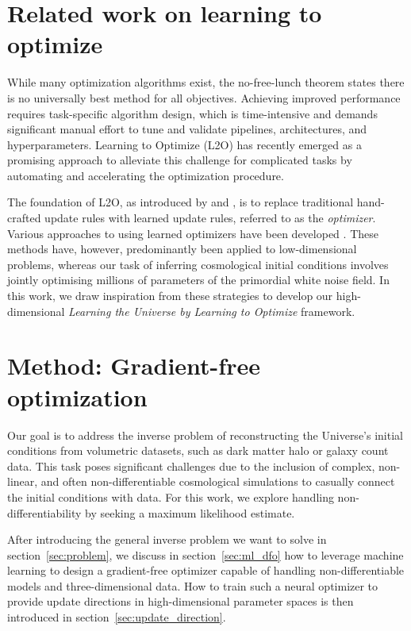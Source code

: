 \section{Related work on learning to optimize}
\label{sec:DFO}

While many optimization algorithms exist, the no-free-lunch theorem \citep{Wolpert1997} states there is no universally best method for all objectives. Achieving improved performance requires task-specific algorithm design, which is time-intensive and demands significant manual effort to tune and validate pipelines, architectures, and hyperparameters. Learning to Optimize (L2O) has recently emerged as a promising approach to alleviate this challenge for complicated tasks by automating and accelerating the optimization procedure.

The foundation of L2O, as introduced by \citet{Li2016} and \citet{Andrychowicz2016}, is to replace traditional hand-crafted update rules with learned update rules, referred to as the \textit{optimizer}. Various approaches to using learned optimizers have been developed \citep{Chen2016, Li2017, Metz2020, Chen2021a, Zheng2022, Premont-Schwarz2022, Heaton2023}. These methods have, however, predominantly been applied to low-dimensional problems, whereas our task of inferring cosmological initial conditions involves jointly optimising millions of parameters of the primordial white noise field. In this work, we draw inspiration from these strategies to develop our high-dimensional \textit{Learning the Universe by Learning to Optimize} framework.

\section{Method: Gradient-free optimization}
\label{sec:method}
Our goal is to address the inverse problem of reconstructing the Universe's initial conditions from volumetric datasets, such as dark matter halo or galaxy count data. This task poses significant challenges due to the inclusion of complex, non-linear, and often non-differentiable cosmological simulations to casually connect the initial conditions with data. For this work, we explore handling non-differentiability by seeking a maximum likelihood estimate. 

After introducing the general inverse problem we want to solve in section~\ref{sec:problem}, we discuss in section~\ref{sec:ml_dfo} how to leverage machine learning to design a gradient-free optimizer capable of handling non-differentiable models and three-dimensional data. How to train such a neural optimizer to provide update directions in high-dimensional parameter spaces is then introduced in section~\ref{sec:update_direction}. 

